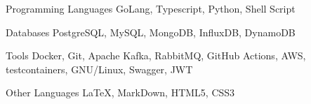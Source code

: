 
\begin{cvskills}
  \cvskill
  {Programming Languages}
  {GoLang, Typescript, Python, Shell Script}

  \cvskill
  {Databases}
  {PostgreSQL, MySQL, MongoDB, InfluxDB, DynamoDB}

  \cvskill
  {Tools}
  {Docker, Git, Apache Kafka, RabbitMQ, GitHub Actions, AWS, testcontainers, GNU/Linux, Swagger, JWT}


  \cvskill
  {Other Languages}
  {LaTeX, MarkDown, HTML5, CSS3}
\end{cvskills}
